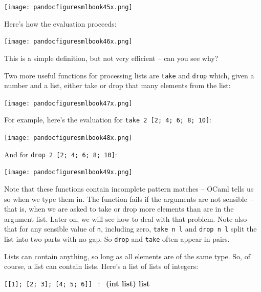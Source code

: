 \documentclass[]{book}
\newcommand{\smspace}{\vspace{4mm}}
\begin{document}
\medskip
\begin{center}
\noindent\texttt{[image: pandocfiguresmlbook45x.png]}
\end{center}
\medskip

\noindent Here's how the evaluation proceeds:

\medskip
\begin{center}
\noindent\texttt{[image: pandocfiguresmlbook46x.png]}
\end{center}
\medskip

\noindent This is a simple definition, but not very efficient -- can you see why?

Two more useful functions for processing lists are \texttt{take} and \texttt{drop} which, given a number and a list, either take or drop that many elements from the list:

\medskip
\begin{center}
\noindent\texttt{[image: pandocfiguresmlbook47x.png]}
\end{center}
\medskip

\noindent For example, here's the evaluation for \texttt{take 2 [2; 4; 6; 8; 10]}:

\medskip
\begin{center}
\noindent\texttt{[image: pandocfiguresmlbook48x.png]}
\end{center}
\medskip

\noindent And for \texttt{drop 2 [2; 4; 6; 8; 10]}:

\medskip
\begin{center}
\noindent\texttt{[image: pandocfiguresmlbook49x.png]}
\end{center}
\medskip

\noindent Note that these functions contain incomplete pattern matches -- OCaml tells us so when we type them in. The function fails if the arguments are not sensible -- that is, when we are asked to take or drop more elements than are in the argument list. Later on, we will see how to deal with that problem. Note also that for any sensible value of \texttt{n}, including zero, \texttt{take n l} and \texttt{drop n l} split the list into two parts with no gap. So \texttt{drop} and \texttt{take} often appear in pairs.

Lists can contain anything, so long as all elements are of the same type. So, of course, a list can contain lists. Here's a list of lists of integers:

\smspace
\texttt{[[1]; [2; 3]; [4; 5; 6]]} \ : \ \textsf{\textbf{\textmd{(}int list\textmd{)} list}} 
\smspace
\end{document}
